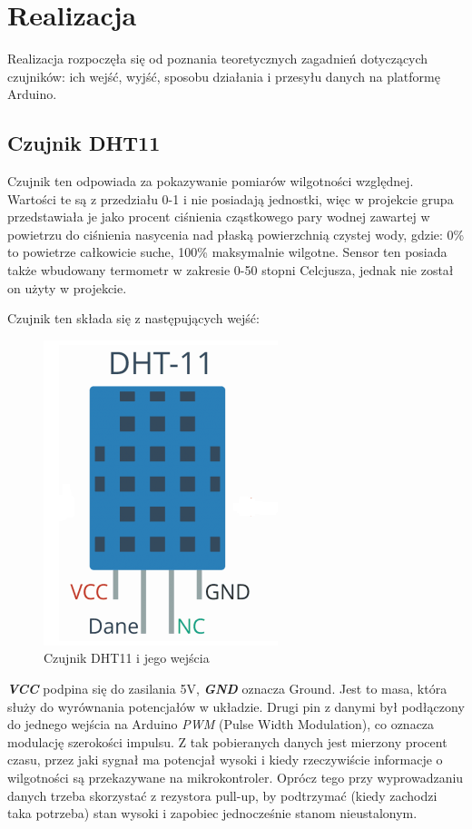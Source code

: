 \documentclass[polish, 11pt]{article}
\begin{document}
\vspace{1cm}
\section{Realizacja}
Realizacja rozpoczęła się od poznania teoretycznych zagadnień dotyczących czujników: ich wejść, wyjść, sposobu działania i przesyłu danych na platformę Arduino. 

\subsection{Czujnik DHT11}
Czujnik ten odpowiada za pokazywanie pomiarów wilgotności względnej. Wartości te są z przedziału 0-1 i nie posiadają jednostki, więc w projekcie grupa przedstawiała je jako procent ciśnienia cząstkowego pary wodnej zawartej w powietrzu do ciśnienia nasycenia nad płaską powierzchnią czystej wody, gdzie: 0\% to powietrze całkowicie suche, 100\% maksymalnie wilgotne. Sensor ten posiada także wbudowany termometr w zakresie 0-50 stopni Celcjusza, jednak nie został on użyty w projekcie. 

\pagebreak
\begin{center}Czujnik ten składa się z następujących wejść:\end{center} 
\begin{figure}[H]
    \centering
    \includegraphics[scale=0.6]{dht11.png}
\caption{Czujnik DHT11 i jego wejścia}
\end{figure}
\textbf{\textit{VCC}} podpina się do zasilania 5V, \textbf{\textit{GND}} oznacza Ground. Jest to masa, która służy do wyrównania potencjałów w układzie. Drugi pin z danymi był podłączony do jednego wejścia na Arduino \textit{PWM} (Pulse Width Modulation), co oznacza modulację szerokości impulsu. Z tak pobieranych danych jest mierzony procent czasu, przez jaki sygnał ma potencjał wysoki i kiedy rzeczywiście informacje o wilgotności są przekazywane na mikrokontroler. Oprócz tego przy wyprowadzaniu danych trzeba skorzystać z rezystora pull-up, by podtrzymać (kiedy zachodzi taka potrzeba) stan wysoki i zapobiec jednocześnie stanom nieustalonym. 
\end{document}
